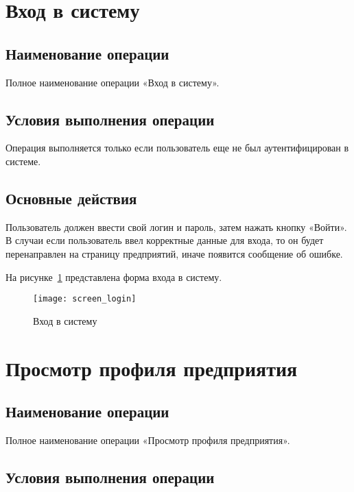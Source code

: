 \documentclass[a4paper]{G2-105}
\begin{document}
\section{Вход в систему}

\ttl

\subsection{Наименование операции}

Полное наименование операции «Вход в систему».

\subsection{Условия выполнения операции}

Операция выполняется только если пользователь еще не был аутентифицирован в системе.

\subsection{Основные действия}

Пользователь должен ввести свой логин и пароль, затем нажать кнопку «Войти». В случаи если пользователь ввел корректные данные для входа, то он будет перенаправлен на страницу предприятий, иначе появится сообщение об ошибке.

На рисунке~\ref{fig:screen_login} представлена форма входа в систему.

\begin{figure}[H]
\centering
\texttt{[image: screen\_login]}
\caption{Вход в систему}
\label{fig:screen_login}
\end{figure}

\section{Просмотр профиля предприятия}

\ttl

\subsection{Наименование операции}

Полное наименование операции «Просмотр профиля предприятия».

\subsection{Условия выполнения операции}
\end{document}
